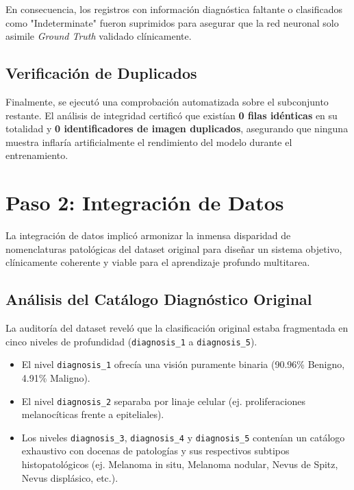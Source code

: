 En consecuencia, los registros con información diagnóstica faltante o clasificados como "Indeterminate" fueron suprimidos para asegurar que la red neuronal solo asimile \textit{Ground Truth} validado clínicamente.

\subsection{Verificación de Duplicados}
Finalmente, se ejecutó una comprobación automatizada sobre el subconjunto restante. El análisis de integridad certificó que existían \textbf{0 filas idénticas} en su totalidad y \textbf{0 identificadores de imagen duplicados}, asegurando que ninguna muestra inflaría artificialmente el rendimiento del modelo durante el entrenamiento.

\section{Paso 2: Integración de Datos}

La integración de datos implicó armonizar la inmensa disparidad de nomenclaturas patológicas del dataset original para diseñar un sistema objetivo, clínicamente coherente y viable para el aprendizaje profundo multitarea.

\subsection{Análisis del Catálogo Diagnóstico Original}
La auditoría del dataset reveló que la clasificación original estaba fragmentada en cinco niveles de profundidad (\texttt{diagnosis\_1} a \texttt{diagnosis\_5}). 
\begin{itemize}
	\item El nivel \texttt{diagnosis\_1} ofrecía una visión puramente binaria (90.96\% Benigno, 4.91\% Maligno).
	\item El nivel \texttt{diagnosis\_2} separaba por linaje celular (ej. proliferaciones melanocíticas frente a epiteliales).
	\item Los niveles \texttt{diagnosis\_3}, \texttt{diagnosis\_4} y \texttt{diagnosis\_5} contenían un catálogo exhaustivo con docenas de patologías y sus respectivos subtipos histopatológicos (ej. Melanoma in situ, Melanoma nodular, Nevus de Spitz, Nevus displásico, etc.).
\end{itemize}

